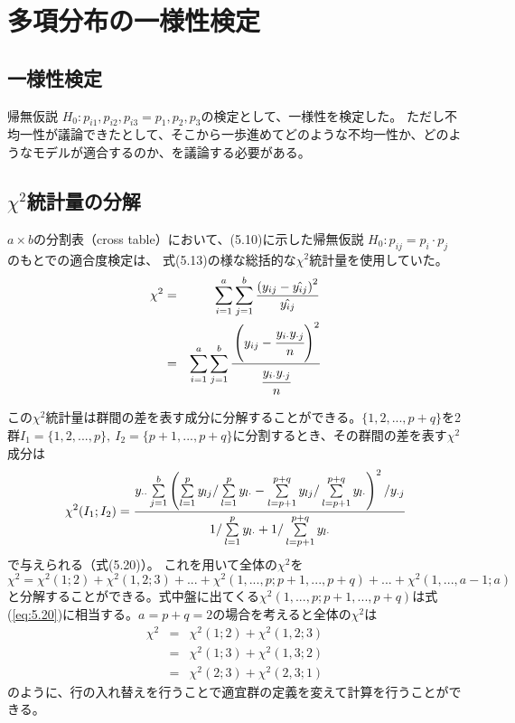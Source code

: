\documentclass[10pt, a4paper]{ltjsarticle}
\newcommand\refeq[1]{式(\ref{#1})}
\begin{document}
\section{多項分布の一様性検定}

\subsection{一様性検定}

帰無仮説 $H_0: p_{i1},p_{i2},p_{i3}=p_1,p_2,p_3$の検定として、一様性を検定した。
ただし不均一性が議論できたとして、そこから一歩進めてどのような不均一性か、どのようなモデルが適合するのか、を議論する必要がある。


\subsection{$\chi^2$統計量の分解}

$a\times b$の分割表（cross table）において、(5.10)に示した帰無仮説 $H_0 : p_{ij} = p_i\cdot p_j$ のもとでの適合度検定は、
式(5.13)の様な総括的な$\chi^2$統計量を使用していた。
\begin{eqnarray}
  \chi^2 &=& \sum_{i=1}^a\sum_{j=1}^b  \frac{\left(y_{ij} - \hat{y_{ij}} \right)^2 }{\hat{y_{ij}}} \\
  &=& \sum_{i=1}^a\sum_{j=1}^b \cfrac{\left(y_{ij} - \cfrac{y_{i\cdot}y_{\cdot j}}{n} \right)^2}{\cfrac{y_{i\cdot}y_{\cdot j}}{n}}
\end{eqnarray}

この$\chi^2$統計量は群間の差を表す成分に分解することができる。$\{1,2,...,p+q\}$を2群$I_1=\{1,2,...,p\},~I_2=\{p+1,...,p+q\}$に分割するとき、その群間の差を表す$\chi^2$成分は
\begin{equation}
  \chi^2(I_1;I_2) = \cfrac{y_{\cdot\cdot}\sum\limits_{j=1}^b
  \left(
    \sum\limits_{l=1}^p y_{lj} / \sum\limits_{l=1}^p y_{l\cdot} 
    - \sum\limits_{l=p+1}^{p+q} y_{lj} / \sum\limits_{l=p+1}^{p+q} y_{l\cdot} 
    \right)^2/y_{\cdot j}
  }{
  1/\sum\limits_{l=1}^p y_{l\cdot} + 1/\sum\limits_{l=p+1}^{p+q} y_{l\cdot}  
  }
  \label{eq:5.20}
\end{equation}
で与えられる（式(5.20)）。
これを用いて全体の$\chi^2$を
\begin{equation}
  \chi^2 = \chi^2(1;2) + \chi^2(1,2;3) + ... + \chi^2(1,...,p;p+1,...,p+q)+...+\chi^2(1,...,a-1;a)
\end{equation}
と分解することができる。式中盤に出てくる$\chi^2(1,...,p;p+1,...,p+q)$は\refeq{eq:5.20}に相当する。$a=p+q=2$の場合を考えると全体の$\chi^2$は
\begin{eqnarray}
  \chi^2 &=& \chi^2(1;2) + \chi^2(1,2; 3) \\
  &=& \chi^2(1;3) + \chi^2(1,3;2) \\
  &=& \chi^2(2;3) + \chi^2(2,3;1)
\end{eqnarray}
のように、行の入れ替えを行うことで適宜群の定義を変えて計算を行うことができる。
\end{document}
